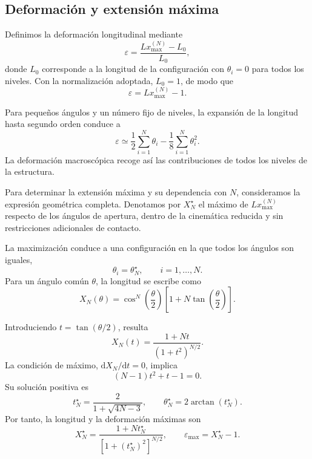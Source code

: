 \documentclass[11pt,a4paper]{article}
\begin{document}
\subsection{Deformación y extensión máxima}
\label{sec:strain_max}

Definimos la deformación longitudinal mediante
\begin{equation}
\varepsilon
=
\frac{Lx_{\max}^{(N)}-L_0}{L_0},
\label{eq:strain_def}
\end{equation}
donde $L_0$ corresponde a la longitud de la configuración con
$\theta_i=0$ para todos los niveles. Con la normalización adoptada,
$L_0=1$, de modo que
\begin{equation}
\varepsilon=Lx_{\max}^{(N)}-1.
\end{equation}

Para pequeños ángulos y un número fijo de niveles, la expansión
de la longitud hasta segundo orden conduce a
\begin{equation}
\varepsilon
\simeq
\frac12\sum_{i=1}^{N}\theta_i
-
\frac18\sum_{i=1}^{N}\theta_i^2.
\label{eq:strain_small_angles}
\end{equation}
La deformación macroscópica recoge así las contribuciones de
todos los niveles de la estructura.

Para determinar la extensión máxima y su dependencia con $N$,
consideramos la expresión geométrica completa. Denotamos por
$X_N^\star$ el máximo de $Lx_{\max}^{(N)}$ respecto de los
ángulos de apertura, dentro de la cinemática reducida y sin
restricciones adicionales de contacto.

La maximización conduce a una configuración en la que todos
los ángulos son iguales,
\begin{equation}
\theta_i=\theta_N^\star,
\qquad i=1,\ldots,N.
\end{equation}
Para un ángulo común $\theta$, la longitud se escribe como
\begin{equation}
X_N(\theta)
=
\cos^N\!\left(\frac{\theta}{2}\right)
\left[
1+N\tan\!\left(\frac{\theta}{2}\right)
\right].
\label{eq:length_equal_angles}
\end{equation}

Introduciendo $t=\tan(\theta/2)$, resulta
\begin{equation}
X_N(t)=\frac{1+Nt}{(1+t^2)^{N/2}}.
\end{equation}
La condición de máximo,
$\mathrm{d}X_N/\mathrm{d}t=0$, implica
\begin{equation}
(N-1)t^2+t-1=0.
\end{equation}
Su solución positiva es
\begin{equation}
t_N^\star
=
\frac{2}{1+\sqrt{4N-3}},
\qquad
\theta_N^\star=2\arctan(t_N^\star).
\label{eq:theta_max_extension}
\end{equation}
Por tanto, la longitud y la deformación máximas son
\begin{equation}
X_N^\star
=
\frac{1+Nt_N^\star}
{\left[1+(t_N^\star)^2\right]^{N/2}},
\qquad
\varepsilon_{\max}=X_N^\star-1.
\label{eq:max_extension_finite_N}
\end{equation}
\end{document}
